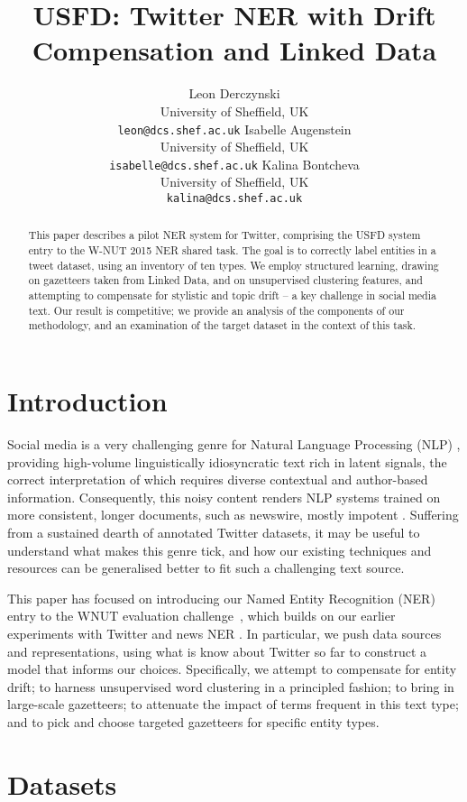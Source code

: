 \documentclass[11pt|a4paper]{article}
\title{USFD: Twitter NER with Drift Compensation and Linked Data}
\author{Leon Derczynski\\
  University of Sheffield, UK\\
  {\small {\tt leon@dcs.shef.ac.uk} } \And
  Isabelle Augenstein\\
  University of Sheffield, UK\\
  {\small {\tt isabelle@dcs.shef.ac.uk} } \And
  Kalina Bontcheva\\
  University of Sheffield, UK\\
  {\small {\tt  kalina@dcs.shef.ac.uk} } }
\date{}
\begin{document}
\maketitle
\begin{abstract}
This paper describes a pilot NER system for Twitter, comprising the USFD system entry to the W-NUT 2015 NER shared task.
The goal is to correctly label entities in a tweet dataset, using an inventory of ten types.
We employ structured learning, drawing on gazetteers taken from Linked Data, and on unsupervised clustering features, and attempting to compensate for stylistic and topic drift -- a key challenge in social media text.
Our result is competitive; we provide an analysis of the components of our methodology, and an examination of the target dataset in the context of this task.
\end{abstract}

\section{Introduction}

Social media is a very challenging genre for Natural Language Processing (NLP) \cite{Derczynski2013b}, providing high-volume linguistically idiosyncratic text rich in latent signals,  the correct interpretation of which requires diverse contextual and author-based information. Consequently, this noisy content renders NLP systems trained on more consistent, longer documents, such as newswire, mostly impotent \cite{Derczynski2014b}. 
Suffering from a sustained dearth of annotated Twitter datasets, it may be useful to understand what makes this genre tick, and how our existing techniques and resources can be generalised better to fit such a challenging text source.

This paper has focused on introducing our Named Entity Recognition (NER) entry to the WNUT evaluation challenge~\cite{baldwin2015wnut}, which builds on our earlier experiments with Twitter and news NER \cite{derczynski2014passive,bontcheva2013twitie,Cun02b-short}. In particular, we push data sources and representations, using what is know about Twitter so far to construct a model that informs our choices.
Specifically, we attempt to compensate for entity drift; to harness unsupervised word clustering in a principled fashion; to bring in large-scale gazetteers; to attenuate the impact of terms frequent in this text type; and to pick and choose targeted gazetteers for specific entity types.

\section{Datasets}
\end{document}
